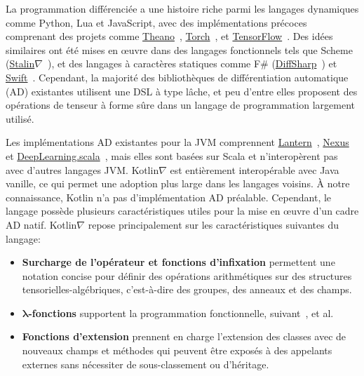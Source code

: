 La programmation différenciée a une histoire riche parmi les langages dynamiques comme Python, Lua et JavaScript, avec des implémentations précoces comprenant des projets comme \href{http://deeplearning.net/software/theano/}{Theano}~\citep{bergstra2010theano}, \href{http://torch.ch/}{Torch}~\citep{collobert2002torch}, et \href{https://tensorflow.org/}{TensorFlow}~\citep{abadi2016tensorflow}. Des idées similaires ont été mises en œuvre dans des langages fonctionnels tels que Scheme (\href{https://github.com/Functional-AutoDiff/STALINGRAD}{Stalin$\nabla$}~\citep{pearlmutter2008using}), et des langages à caractères statiques comme F\# (\href{https://diffsharp.github.io/DiffSharp/}{DiffSharp}~\citep{baydin2015diffsharp}) et \href{https://www.tensorflow.org/swift}{Swift}~\citep{lattner2018tensorflow}. Cependant, la majorité des bibliothèques de différentiation automatique (AD) existantes utilisent une DSL à type lâche, et peu d'entre elles proposent des opérations de tenseur à forme sûre dans un langage de programmation largement utilisé.

Les implémentations AD existantes pour la JVM comprennent \href{https://feiwang3311.github.io/Lantern/}{Lantern}~\citep{wang2018demystifying}, \href{https://tongfei.me/nexus/}{Nexus}~\citep{chen2017typesafe} et \href{https://github.com/ThoughtWorksInc/DeepLearning.scala}{DeepLearning.scala}~\citep{yang2018dl4s}, mais elles sont basées sur Scala et n'interopèrent pas avec d'autres langages JVM. Kotlin$\nabla$ est entièrement interopérable avec Java vanille, ce qui permet une adoption plus large dans les langages voisins. À notre connaissance, Kotlin n'a pas d'implémentation AD préalable. Cependant, le langage possède plusieurs caractéristiques utiles pour la mise en œuvre d'un cadre AD natif. Kotlin$\nabla$ repose principalement sur les caractéristiques suivantes du langage:

\begin{itemize}
    \item \textbf{Surcharge de l'opérateur et fonctions d'infixation} permettent une notation concise pour définir des opérations arithmétiques sur des structures tensorielles-algébriques, c'est-à-dire des groupes, des anneaux et des champs.
    \item \textbf{$\mathbf{\lambda}$-fonctions} supportent la programmation fonctionnelle, suivant~\citet{pearlmutter2008reverse, pearlmutter2008using, siskind2008nesting, elliott2009beautiful, elliott2018simple}, et al.
    \item \textbf{Fonctions d'extension} prennent en charge l'extension des classes avec de nouveaux champs et méthodes qui peuvent être exposés à des appelants externes sans nécessiter de sous-classement ou d'héritage.
\end{itemize}

